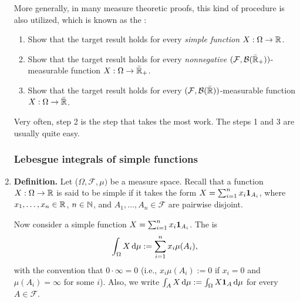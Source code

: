\begin{enumerate}
\begin{enumerate}[label={(\arabic*)}]
\end{enumerate}
More generally, in many measure theoretic proofs, this kind of procedure is
also utilized, which is known as the :
\begin{enumerate}[label={(\arabic*)}]
\item Show that the target result holds for every \emph{simple function} \(X:\Omega\to\mathbb{R}\).
\item Show that the target result holds for every
\emph{nonnegative} \((\mathcal{F},\mathcal{B}(\bar{\mathbb{R}}_{+}))\)-measurable function
\(X:\Omega\to\bar{\mathbb{R}}_{+}\).
\item Show that the target result holds for every
\((\mathcal{F},\mathcal{B}(\bar{\mathbb{R}}))\)-measurable function
\(X:\Omega\to\bar{\mathbb{R}}\).
\end{enumerate}
Very often, step 2 is the step that takes the most work. The steps 1 and 3 are
usually quite easy.

\subsubsection*{Lebesgue integrals of simple functions}
\item \textbf{Definition.} Let
(\(\Omega,\mathcal{F},\mu)\) be a measure space. Recall that a function
\(X:\Omega\to\mathbb{R}\) is said to be simple if it takes the form
\(X=\sum_{i=1}^{n}x_i\mathbf{1}_{A_i}\), where \(x_1,\dotsc,x_n\in\mathbb{R}\), \(n\in\mathbb{N}\),
and \(A_1,\dotsc,A_n\in\mathcal{F}\) are pairwise disjoint.

Now consider a simple function \(X=\sum_{i=1}^{n}x_i\mathbf{1}_{A_i}\). The
 is
\[
\int_{\Omega}^{}X\odif{\mu}:=\sum_{i=1}^{n}x_i\mu(A_i),
\]
with the convention that \(0\cdot \infty=0\) (i.e., \(x_i\mu(A_i):=0\) if
\(x_i=0\) and \(\mu(A_i)=\infty\) for some \(i\)). Also, we write
\(\int_{A}^{}X\odif{\mu}:=\int_{\Omega}^{}X\indic_{A}\odif{\mu}\) for every \(A\in\mathcal{F}\).


\end{enumerate}
